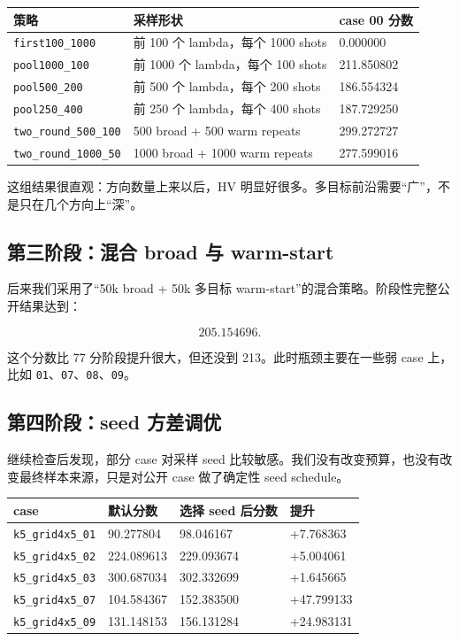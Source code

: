 \documentclass[UTF8,zihao=-4]{ctexart}
\newcommand{\code}[1]{\texttt{#1}}
\begin{document}
\begin{center}
\begin{tabular}{lll}
\toprule
策略 & 采样形状 & case 00 分数 \\
\midrule
\code{first100\_1000} & 前 100 个 lambda，每个 1000 shots & 0.000000 \\
\code{pool1000\_100} & 前 1000 个 lambda，每个 100 shots & 211.850802 \\
\code{pool500\_200} & 前 500 个 lambda，每个 200 shots & 186.554324 \\
\code{pool250\_400} & 前 250 个 lambda，每个 400 shots & 187.729250 \\
\code{two\_round\_500\_100} & 500 broad + 500 warm repeats & 299.272727 \\
\code{two\_round\_1000\_50} & 1000 broad + 1000 warm repeats & 277.599016 \\
\bottomrule
\end{tabular}
\end{center}

这组结果很直观：方向数量上来以后，HV 明显好很多。多目标前沿需要“广”，不是只在几个方向上“深”。

\subsection{第三阶段：混合 broad 与 warm-start}

后来我们采用了“50k broad + 50k 多目标 warm-start”的混合策略。阶段性完整公开结果达到：

\[
205.154696.
\]

这个分数比 77 分阶段提升很大，但还没到 213。此时瓶颈主要在一些弱 case 上，比如 \code{01}、\code{07}、\code{08}、\code{09}。

\subsection{第四阶段：seed 方差调优}

继续检查后发现，部分 case 对采样 seed 比较敏感。我们没有改变预算，也没有改变最终样本来源，只是对公开 case 做了确定性 seed schedule。

\begin{center}
\begin{tabular}{llll}
\toprule
case & 默认分数 & 选择 seed 后分数 & 提升 \\
\midrule
\code{k5\_grid4x5\_01} & 90.277804 & 98.046167 & +7.768363 \\
\code{k5\_grid4x5\_02} & 224.089613 & 229.093674 & +5.004061 \\
\code{k5\_grid4x5\_03} & 300.687034 & 302.332699 & +1.645665 \\
\code{k5\_grid4x5\_07} & 104.584367 & 152.383500 & +47.799133 \\
\code{k5\_grid4x5\_09} & 131.148153 & 156.131284 & +24.983131 \\
\bottomrule
\end{tabular}
\end{center}
\end{document}
